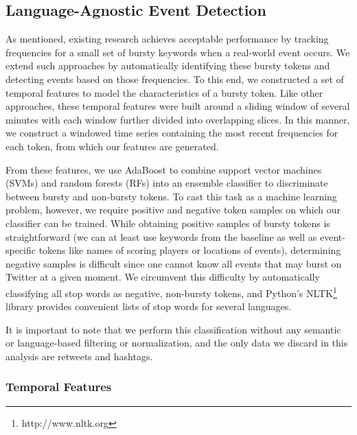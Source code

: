 \documentclass{sig-alternate}
\begin{document}
\subsection{Language-Agnostic Event Detection}

As mentioned, existing research achieves acceptable performance by tracking frequencies for a small set of bursty keywords when a real-world event occurs.
We extend such approaches by automatically identifying these bursty tokens and detecting events based on those frequencies.
To this end, we constructed a set of temporal features to model the characteristics of a bursty token.
Like other approaches, these temporal features were built around a sliding window of several minutes with each window further divided into overlapping slices. %
In this manner, we construct a windowed time series containing the most recent frequencies for each token, from which our features are generated.


From these features, we use AdaBoost to combine support vector machines (SVMs) and random forests (RFs) into an ensemble classifier to discriminate between bursty and non-bursty tokens.
To cast this task as a machine learning problem, however, we require positive and negative token samples on which our classifier can be trained.
While obtaining positive samples of bursty tokens is straightforward (we can at least use keywords from the baseline as well as event-specific tokens like names of scoring players or locations of events), determining negative samples is difficult since one cannot know all events that may burst on Twitter at a given moment.
We circumvent this difficulty by automatically classifying all stop words as negative, non-bursty tokens, and Python's NLTK\footnote{http://www.nltk.org} library provides convenient lists of stop words for several languages.

It is important to note that we perform this classification without any semantic or language-based filtering or normalization, and the only data we discard in this analysis are retweets and hashtags.

\subsubsection{Temporal Features}
\end{document}

